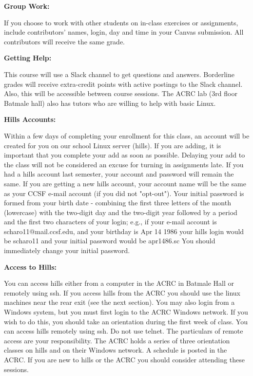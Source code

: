 \documentclass[11pt]{article}
\begin{document}
\textbf {Group Work:}

\hspace{3mm}

If you choose to work with other students on in-class exercises or assignments,
include contributors' names, login, day and time in your Canvas submission. All contributors will receive the same grade. 

\hspace{3mm}

\textbf{Getting Help:}

\hspace{3mm}

This course will use a Slack channel to get questions and answers. Borderline
grades will receive extra-credit points with active postings to the Slack
channel.  Also, this will be accessible between course sessions. The ACRC lab
(3rd floor Batmale hall) also has tutors who are willing to help with basic
Linux.

\hspace{3mm}

\textbf{Hills Accounts:}

\hspace{3mm}

Within a few days of completing your enrollment for this class, an account will
be created for you on our school Linux server (hills). If you are adding, it is
important that you complete your add as soon as possible. Delaying your add to
the class will not be considered an excuse for turning in assignments late. If
you had a hills account last semester, your account and password will remain
the same. If you are getting a new hills account, your account name will be the
same as your CCSF e-mail account (if you did not "opt-out"). Your initial
password is formed from your birth date - combining the first three letters of
the month (lowercase) with the two-digit day and the two-digit year followed by
a period and the first two characters of your login; e.g., if your e-mail
account is scharo11@mail.ccsf.edu, and your birthday is Apr 14 1986 your hills
login would be scharo11 and your initial password would be apr1486.sc You
should immediately change your initial password.

\hspace{3mm}

\textbf{Access to Hills:}

\hspace{3mm}

You can access hills either from a computer in the ACRC in Batmale Hall or
remotely using ssh. If you access hills from the ACRC you should use the linux
machines near the rear exit (see the next section). You may also login from a
Windows system, but you must first login to the ACRC Windows network. If you
wish to do this, you should take an orientation during the first week of class.
You can access hills remotely using ssh. Do not use telnet. The particulars of
remote access are your responsibility. The ACRC holds a series of three
orientation classes on hills and on their Windows network. A schedule is posted
in the ACRC. If you are new to hills or the ACRC you should consider attending
these sessions.
\end{document}

